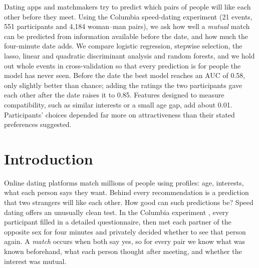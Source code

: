 

Dating apps and matchmakers try to predict which pairs of people will like each other before they meet. Using the
Columbia speed-dating experiment (21 events, 551 participants and 4,184 woman--man pairs), we ask how well a
\emph{mutual} match can be predicted from information available before the date, and how much the four-minute date
adds. We compare logistic regression, stepwise selection, the lasso, linear and quadratic discriminant analysis and
random forests, and we hold out whole events in cross-validation so that every prediction is for people the model has
never seen. Before the date the best model reaches an AUC of 0.58, only slightly better than chance; adding the
ratings the two participants gave each other after the date raises it to 0.85. Features designed to measure
compatibility, such as similar interests or a small age gap, add about 0.01. Participants' choices depended far more
on attractiveness than their stated preferences suggested.

\section{Introduction}

Online dating platforms match millions of people using profiles: age, interests, what each person says they want.
Behind every recommendation is a prediction that two strangers will like each other. How good can such predictions
be? Speed dating offers an unusually clean test. In the Columbia experiment \cite[Section II]{Fisman:2006}, every
participant filled in a detailed questionnaire, then met each partner of the opposite sex for four minutes and
privately decided whether to see that person again. A \emph{match} occurs when both say yes, so for every pair we
know what was known beforehand, what each person thought after meeting, and whether the interest was mutual.

